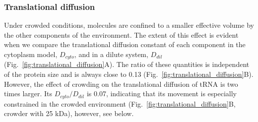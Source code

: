 \documentclass[journal=jpcisd8,manuscript=article]{achemso}
\begin{document}
\subsubsection{Translational diffusion}

Under crowded conditions, molecules are confined to a smaller
effective volume by the other components of the environment.  The
extent of this effect is evident when we compare the translational
diffusion constant of each component in the cytoplasm model,
$D_{cyto}$, and in a dilute system, $D_{dil}$
(Fig.~\ref{fig:translational_diffusion}A). The ratio of these
quantities is independent of the protein size and is always close to
0.13 (Fig.~\ref{fig:translational_diffusion}B). However, the effect of
crowding on the translational diffusion of tRNA is two times
larger. Its $D_{cyto}/D_{dil}$ is 0.07, indicating that its movement
is especially constrained in the crowded environment
(Fig.~\ref{fig:translational_diffusion}B, crowder with 25 kDa),
however, see below.
\end{document}
